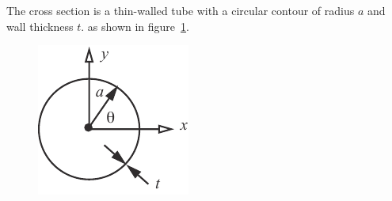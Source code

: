 \documentclass{AeroStructure-ERJohnson}
\begin{document}
\begin{example*}\label{ex6.4}The cross section is a thin-walled tube with a circular contour of radius $a$ and wall thickness $t$. as shown in figure~\ref{fig6.8}.

\begin{figure}
\vspace{-19pt}
\includegraphics{Figure_6-8.pdf}
\caption{ \label{fig6.8}}
\end{figure}



\end{example*}
\end{document}
